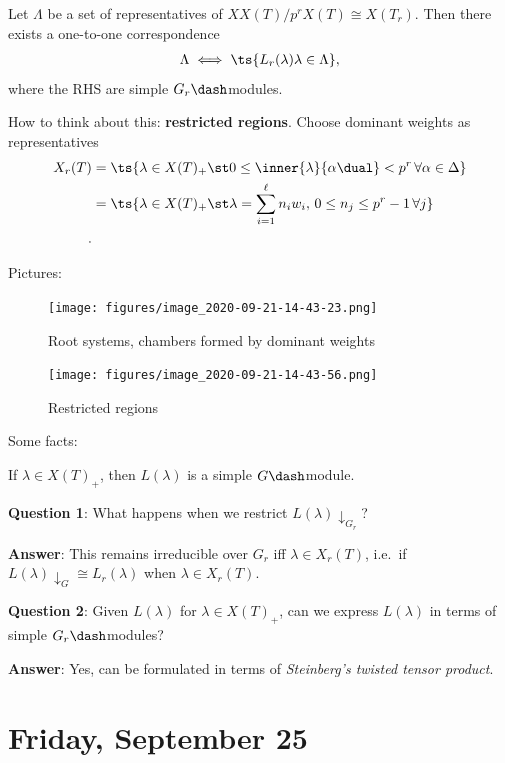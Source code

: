 \begin{theorem}

Let \(\Lambda\) be a set of representatives of
\(XX(T) / p^r X(T) \cong X(T_r)\). Then there exists a one-to-one
correspondence
\begin{align*}  
\Lambda \iff \ts{L_r(\lambda) \lambda \in \Lambda}
,\end{align*} where the RHS are simple \(G_r\dash\)modules.

\end{theorem}

How to think about this: \textbf{restricted regions}. Choose dominant
weights as representatives
\begin{align*}  
X_r(T) 
&= \ts{\lambda \in X(T)_+ \st 0\leq \inner{\lambda}{\alpha\dual} < p^r\, \forall \alpha\in \Delta } \\
&= \ts{\lambda \in X(T)_+ \st \lambda = \sum_{i=1}^\ell n_i w_i,\, 0\leq n_j \leq p^r-1\, \forall j} \\
.\end{align*}

Pictures:

\begin{figure}
\centering
\texttt{[image: figures/image\_2020-09-21-14-43-23.png]}
\caption{Root systems, chambers formed by dominant weights}
\end{figure}

\begin{figure}
\centering
\texttt{[image: figures/image\_2020-09-21-14-43-56.png]}
\caption{Restricted regions}
\end{figure}

Some facts:

If \(\lambda \in X(T)_+\), then \(L(\lambda)\) is a simple
\(G\dash\)module.

\textbf{Question 1}: What happens when we restrict
\(L(\lambda)\downarrow_{G_r}\)?

\textbf{Answer}: This remains irreducible over \(G_r\) iff
\(\lambda \in X_r(T)\), i.e.~if
\(L(\lambda)\downarrow_{G} \cong L_r(\lambda)\) when
\(\lambda \in X_r(T)\).

\textbf{Question 2}: Given \(L(\lambda)\) for \(\lambda \in X(T)_+\),
can we express \(L(\lambda)\) in terms of simple \(G_r\dash\)modules?

\textbf{Answer}: Yes, can be formulated in terms of \emph{Steinberg's
twisted tensor product}.

\hypertarget{friday-september-25}{%
\section{Friday, September 25}\label{friday-september-25}}

